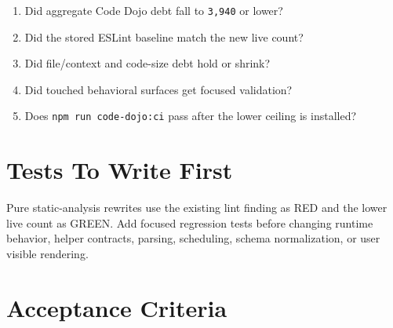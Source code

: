 \begin{enumerate}
\def\labelenumi{\arabic{enumi}.}
\tightlist
\item
  Did aggregate Code Dojo debt fall to \texttt{3\allowbreak{},\allowbreak{}9\allowbreak{}4\allowbreak{}0} or lower?
\item
  Did the stored ESLint baseline match the new live count?
\item
  Did file/context and code-size debt hold or shrink?
\item
  Did touched behavioral surfaces get focused validation?
\item
  Does \texttt{n\allowbreak{}p\allowbreak{}m\allowbreak{} \allowbreak{}r\allowbreak{}u\allowbreak{}n\allowbreak{} \allowbreak{}c\allowbreak{}o\allowbreak{}d\allowbreak{}e\allowbreak{}-\allowbreak{}d\allowbreak{}o\allowbreak{}j\allowbreak{}o\allowbreak{}:\allowbreak{}c\allowbreak{}i} pass after the lower ceiling is installed?
\end{enumerate}

\section{Tests To Write First}\label{record-217-tests-to-write-first}

Pure static-analysis rewrites use the existing lint finding as RED and the lower live count as GREEN. Add focused regression tests before changing runtime behavior, helper contracts, parsing, scheduling, schema normalization, or user visible rendering.

\section{Acceptance Criteria}\label{record-217-acceptance-criteria}

